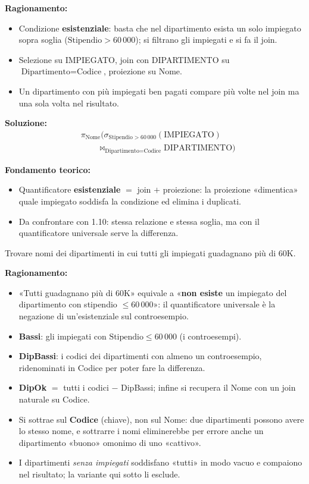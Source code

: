\documentclass[12pt, a4paper]{article}
\begin{document}
\textbf{Ragionamento:}
\begin{itemize}
\item Condizione \textbf{esistenziale}: basta che nel dipartimento esista un solo impiegato sopra soglia ($\text{Stipendio}>60\,000$); si filtrano gli impiegati e si fa il join.
\item Selezione su IMPIEGATO, join con DIPARTIMENTO su $\text{Dipartimento}=\text{Codice}$, proiezione su Nome.
\item Un dipartimento con più impiegati ben pagati compare più volte nel join ma una sola volta nel risultato.
\end{itemize}

\textbf{Soluzione:}
\begin{align*}
&\pi_{\text{Nome}}\Big(\sigma_{\text{Stipendio}>60\,000}(\text{IMPIEGATO})\\
&\qquad\bowtie_{\text{Dipartimento}=\text{Codice}}\text{DIPARTIMENTO}\Big)
\end{align*}

\textbf{Fondamento teorico:}
\begin{itemize}
\item Quantificatore \textbf{esistenziale} $=$ join $+$ proiezione: la proiezione «dimentica» quale impiegato soddisfa la condizione ed elimina i duplicati.
\item Da confrontare con 1.10: stessa relazione e stessa soglia, ma con il quantificatore universale serve la differenza.
\end{itemize}

\begin{tcolorbox}[colback=lightergray!10, colframe=tocsec, title=\textbf{Esercizio 1.10}]
Trovare nomi dei dipartimenti in cui tutti gli impiegati guadagnano più di 60K.
\end{tcolorbox}

\textbf{Ragionamento:}
\begin{itemize}
\item «Tutti guadagnano più di 60K» equivale a «\textbf{non esiste} un impiegato del dipartimento con stipendio $\le 60\,000$»: il quantificatore universale è la negazione di un'esistenziale sul controesempio.
\item \textbf{Bassi}: gli impiegati con $\text{Stipendio}\le 60\,000$ (i controesempi).
\item \textbf{DipBassi}: i codici dei dipartimenti con almeno un controesempio, ridenominati in Codice per poter fare la differenza.
\item \textbf{DipOk} $=$ tutti i codici $-$ DipBassi; infine si recupera il Nome con un join naturale su Codice.
\item Si sottrae sul \textbf{Codice} (chiave), non sul Nome: due dipartimenti possono avere lo stesso nome, e sottrarre i nomi eliminerebbe per errore anche un dipartimento «buono» omonimo di uno «cattivo».
\item I dipartimenti \emph{senza impiegati} soddisfano «tutti» in modo vacuo e compaiono nel risultato; la variante qui sotto li esclude.
\end{itemize}
\end{document}

